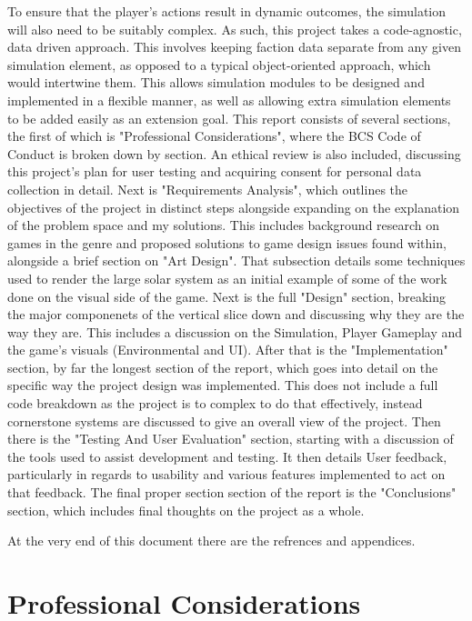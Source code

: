 \documentclass{report}
\begin{document}
To ensure that the player's actions result in dynamic outcomes, the simulation will also need to be suitably complex. As such, this project takes a code-agnostic, data driven approach. This involves keeping faction data separate from any given simulation element, as opposed to a typical object-oriented approach, which would intertwine them. This allows simulation modules to be designed and implemented in a flexible manner, as well as allowing extra simulation elements to be added easily as an extension goal.
\newline
\newline
This report consists of several sections, the first of which is "Professional Considerations", where the BCS Code of Conduct is broken down by section. An ethical review is also included, discussing this project's plan for user testing and acquiring consent for personal data collection in detail. Next is "Requirements Analysis", which outlines the objectives of the project in distinct steps alongside expanding on the explanation of the problem space and my solutions. This includes background research on games in the genre and proposed solutions to game design issues found within, alongside a brief section on "Art Design". That subsection details some techniques used to render the large solar system as an initial example of some of the work done on the visual side of the game.
Next is the full "Design" section, breaking the major componenets of the vertical slice down and discussing why they are the way they are. This includes a discussion on the Simulation, Player Gameplay and the game's visuals (Environmental and UI). After that is the "Implementation" section, by far the longest section of the report, which goes into detail on the specific way the project design was implemented. This does not include a full code breakdown as the project is to complex to do that effectively, instead cornerstone systems are discussed to give an overall view of the project.
Then there is the "Testing And User Evaluation" section, starting with a discussion of the tools used to assist development and testing. It then details User feedback, particularly in regards to usability and various features implemented to act on that feedback.
The final proper section section of the report is the "Conclusions" section, which includes final thoughts on the project as a whole.

 At the very end of this document there are the refrences and appendices.

\chapter{Professional Considerations}
\end{document}
